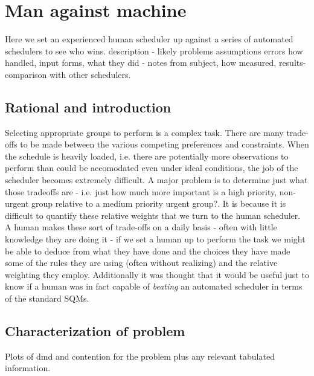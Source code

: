 \section{Man against machine}
\label{sect:mam_study}
Here we set an experienced human scheduler up against a series of automated schedulers to see who wins.
description - likely problems assumptions errors how handled, input forms, what they did - notes from subject, how measured, results-comparison with other schedulers.

\subsection{Rational and introduction}
Selecting appropriate groups to perform is a complex task. There are many trade-offs to be made between the various competing preferences and constraints. When the schedule is heavily loaded, i.e. there are potentially more observations to perform than could be accomodated even under ideal conditions, the job of the scheduler becomes extremely difficult. A major problem is to determine just what those tradeoffs are - i.e. just how much more important is a high priority, non-urgent group relative to a medium priority urgent group?. It is because it is difficult to quantify these relative weights that we turn to the human scheduler. A human makes these sort of trade-offs on a daily basis - often with little knowledge they are doing it - if we set a human up to perform the task we might be able to deduce from what they have done and the choices they have made some of the rules they are using (often without realizing) and the relative weighting they employ. Additionally it was thought that it would be useful just to know if a human was in fact capable of \emph{beating} an automated scheduler in terms of the standard SQMs.


\subsection{Characterization of problem}
Plots of dmd and contention for the problem plus any relevant tabulated information.

